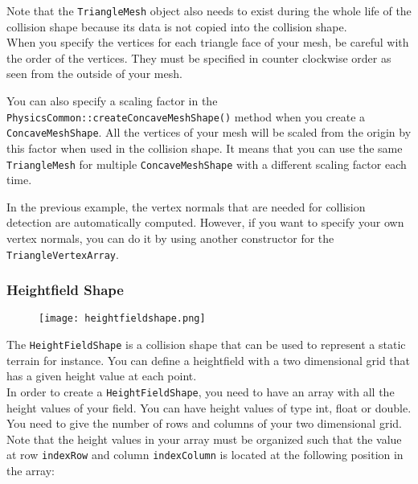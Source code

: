 \documentclass[a4paper,12pt]{article}
\begin{document}
  Note that the \texttt{TriangleMesh} object also needs to exist during the whole life of the collision shape because its
  data is not copied into the collision shape. \\

  When you specify the vertices for each triangle face of your mesh, be careful with the order of the vertices. They must be specified in counter
  clockwise order as seen from the outside of your mesh. \\

  \begin{sloppypar}
  You can also specify a scaling factor in the \texttt{PhysicsCommon::createConcaveMeshShape()} method when you create a
  \texttt{Concave\allowbreak MeshShape}.
  All the vertices of your mesh will be scaled from the origin by this factor when used in the collision shape. It means that you can use the same
  \texttt{TriangleMesh} for multiple \texttt{ConcaveMeshShape} with a different scaling factor each time. \\
  \end{sloppypar}

  In the previous example, the vertex normals that are needed for collision detection are automatically computed. However, if you want to specify your own
  vertex normals, you can do it by using another constructor for the \texttt{TriangleVertexArray}. \\

  \subsubsection{Heightfield Shape}

  \begin{figure}[h]
      \centering
      \texttt{[image: heightfieldshape.png]}
      \label{fig:heightfieldshape}
  \end{figure}

  The \texttt{HeightFieldShape} is a collision shape that can be used to represent a static terrain for instance. You can
  define a heightfield with a two dimensional grid that has a given height value at each point. \\

  In order to create a \texttt{HeightFieldShape}, you need to have an array with all the height values of your field.
  You can have height values of type int, float or double. You need to give the number of rows and columns of your two
  dimensional grid. Note that the height values in your array must be organized such that the value at row
  \texttt{indexRow} and column \texttt{indexColumn} is located at the following position in the array: \\
\end{document}
